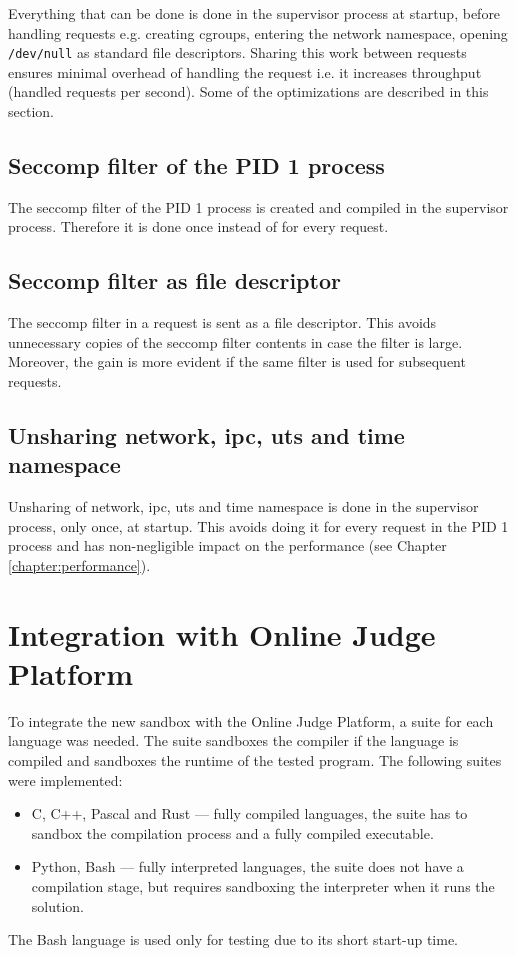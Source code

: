 \documentclass[en]{pracamgr}
\begin{document}
Everything that can be done is done in the supervisor process at startup, before handling requests e.g. creating cgroups, entering the network namespace, opening \texttt{/dev/null} as standard file descriptors. Sharing this work between requests ensures minimal overhead of handling the request i.e. it increases throughput (handled requests per second). Some of the optimizations are described in this section.

\subsection{Seccomp filter of the PID 1 process}

The seccomp filter of the PID 1 process is created and compiled in the supervisor process. Therefore it is done once instead of for every request.

\subsection{Seccomp filter as file descriptor}

The seccomp filter in a request is sent as a file descriptor. This avoids unnecessary copies of the seccomp filter contents in case the filter is large. Moreover, the gain is more evident if the same filter is used for subsequent requests.

\subsection{Unsharing network, ipc, uts and time namespace}

Unsharing of network, ipc, uts and time namespace is done in the supervisor process, only once, at startup. This avoids doing it for every request in the PID 1 process and has non-negligible impact on the performance (see Chapter \ref{chapter:performance}).

\section{Integration with Online Judge Platform}

To integrate the new sandbox with the Online Judge Platform, a suite for each language was needed. The suite sandboxes the compiler if the language is compiled and sandboxes the runtime of the tested program. The following suites were implemented:

\begin{itemize}
    \item C, C++, Pascal and Rust --- fully compiled languages, the suite has to sandbox the compilation process and a fully compiled executable.
    \item Python, Bash --- fully interpreted languages, the suite does not have a compilation stage, but requires sandboxing the interpreter when it runs the solution.
\end{itemize}
The Bash language is used only for testing due to its short start-up time.
\end{document}
